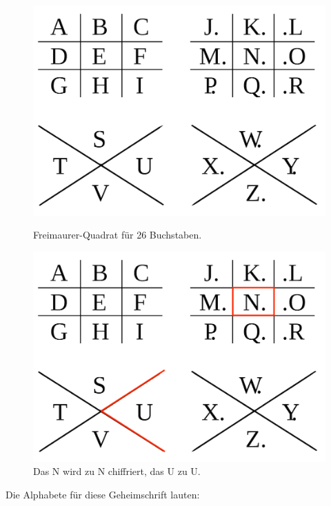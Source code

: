 \begin{figure}[htb]
\centering
\begin{minipage}{0.45\textwidth}
\centering
\includegraphics[scale=0.2]{pigpen}
\caption{Freimaurer-Quadrat für \num{26} Buchstaben.}
\label{figure-freimaurer}
\end{minipage}
\hfill
\begin{minipage}{0.45\textwidth}
\centering
\includegraphics[scale=0.2]{pigpen_examples}
\caption{Das N wird zu {\pigpenfont N} chiffriert, das U zu {\pigpenfont U}.}
\label{figure-freimaurer-beispiel}
\end{minipage}
\end{figure}

Die Alphabete für diese Geheimschrift lauten:

